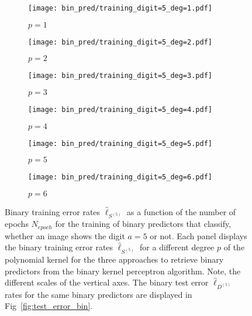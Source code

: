 \begin{figure}[hbt!]
    \begin{subfigure}[t]{0.49\textwidth}
        \centering
        \texttt{[image: bin\_pred/training\_digit=5\_deg=1.pdf]} 
        \caption{$p = 1$}
    \end{subfigure}
    \hfill
    \begin{subfigure}[t]{0.49\textwidth}
        \centering
        \texttt{[image: bin\_pred/training\_digit=5\_deg=2.pdf]} 
        \caption{$p = 2$}
    \end{subfigure}
    \par\bigskip
        \begin{subfigure}[t]{0.49\textwidth}
        \centering
        \texttt{[image: bin\_pred/training\_digit=5\_deg=3.pdf]} 
        \caption{$p = 3$}
    \end{subfigure}
    \hfill
    \begin{subfigure}[t]{0.49\textwidth}
        \centering
        \texttt{[image: bin\_pred/training\_digit=5\_deg=4.pdf]} 
        \caption{$p = 4$}
    \end{subfigure}
    \par\bigskip
        \begin{subfigure}[t]{0.49\textwidth}
        \centering
        \texttt{[image: bin\_pred/training\_digit=5\_deg=5.pdf]} 
        \caption{$p = 5$}
    \end{subfigure}
    \hfill
    \begin{subfigure}[t]{0.49\textwidth}
        \centering
        \texttt{[image: bin\_pred/training\_digit=5\_deg=6.pdf]} 
        \caption{$p = 6$}
    \end{subfigure}
    \caption{Binary training error rates $\hat{\ell}_{S^{(5)}}$ as a function of the number of epochs $N_{epoch}$ for the training of binary predictors that classify, whether an image shows the digit $a=5$ or not. Each panel displays the binary training error rates $\hat{\ell}_{S^{(5)}}$ for a different degree $p$ of the polynomial kernel for the three approaches to retrieve binary predictors from the binary kernel perceptron algorithm. Note, the different scales of the vertical axes. The binary test error $\hat{\ell}_{D^{(5)}}$ rates for the same binary predictors are displayed in Fig~\ref{fig:test_error_bin}.}\label{fig:train_error_bin}
\end{figure}

